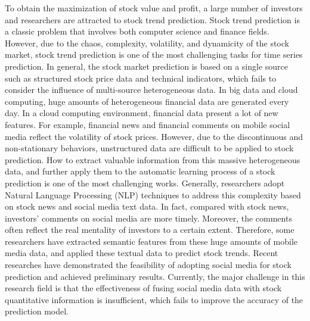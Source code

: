 \documentclass[sn-mathphys]{sn-jnl}%
\theoremstyle{thmstyleone}%
\theoremstyle{thmstyletwo}%
\theoremstyle{thmstylethree}%
\begin{document}
To obtain the maximization of stock value and profit, a large number of investors and researchers are attracted to stock trend prediction. Stock trend prediction is a classic problem that involves both computer science and finance fields. However, due to the chaos, complexity, volatility, and dynamicity of the stock market, stock trend prediction is one of the most challenging tasks for time series prediction\cite{RN169}. In general, the stock market prediction is based on a single source such as structured stock price data and technical indicators, which fails to consider the influence of multi-source heterogeneous data. In big data and cloud computing, huge amounts of heterogeneous financial data are generated every day\cite{RN175}. In a cloud computing environment, financial data present a lot of new features. For example, financial news and financial comments on mobile social media reflect the volatility of stock prices. However, due to the discontinuous and non-stationary behaviors, unstructured data are difficult to be applied to stock prediction\cite{RN159}. How to extract valuable information from this massive heterogeneous data, and further apply them to the automatic learning process of a stock prediction is one of the most challenging works. Generally, researchers adopt Natural Language Processing (NLP) techniques to address this complexity based on stock news and social media text data. In fact, compared with stock news, investors’ comments on social media are more timely. Moreover, the comments often reflect the real mentality of investors to a certain extent\cite{RN158}. Therefore, some researchers have extracted semantic features from these huge amounts of mobile media data, and applied these textual data to predict stock trends\cite{RN177,RN178,RN179}. Recent researches have demonstrated the feasibility of adopting social media for stock prediction and achieved preliminary results. Currently, the major challenge in this research field is that the effectiveness of fusing social media data with stock quantitative information is insufficient, which fails to improve the accuracy of the prediction model.
\end{document}
